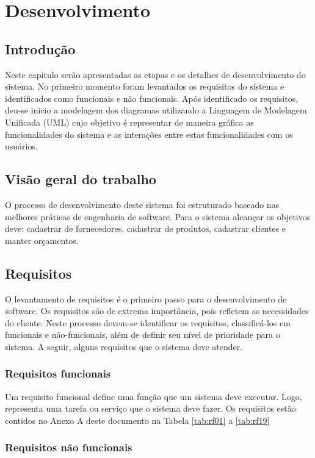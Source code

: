\chapter{Desenvolvimento}

\section{Introdução}

Neste capitulo serão apresentadas as etapas e os detalhes de desenvolvimento do sistema. No primeiro momento foram levantados os requisitos do sistema e identificados como funcionais e não funcionais. 
Após identificado os requisitos, deu-se inicio a modelagem dos diagramas utilizando a Linguagem de Modelagem Unificada (UML) cujo objetivo é representar de maneira gráfica as funcionalidades do sistema e as interações entre estas funcionalidades com os usuários. 


\section{Visão geral do trabalho}

O processo de desenvolvimento deste sistema foi estruturado baseado nas melhores práticas de engenharia de software. Para o sistema alcançar os objetivos deve: cadastrar de fornecedores, cadastrar de produtos, cadastrar clientes e manter orçamentos. 

\section{Requisitos}

O levantamento de requisitos é o primeiro passo para o desenvolvimento de software. Os requisitos são de extrema importância, pois refletem as necessidades do cliente. Neste processo devem-se identificar os requisitos, classificá-los em funcionais e não-funcionais, além de definir seu nível de prioridade para o sistema. A seguir, alguns requisitos que o sistema deve atender.

\subsection{Requisitos funcionais}
Um requisito funcional define uma função que um sistema deve executar. Logo, representa uma tarefa ou serviço que o sistema deve fazer. Os requisitos estão contidos no Anexo A deste documento na Tabela \ref{tab:rf01} a \ref{tab:rf19}


\subsection{Requisitos não funcionais}

